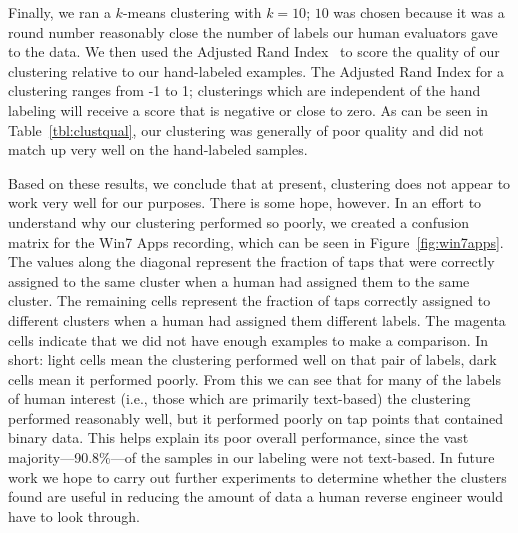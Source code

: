 Finally, we ran a $k$-means clustering with $k = 10$; $10$ was chosen
because it was a round number reasonably close the number of labels our
human evaluators gave to the data. We then used the Adjusted Rand
Index~\cite{Hubert:1985zr} to score the quality of our clustering
relative to our hand-labeled examples. The Adjusted Rand Index for a
clustering ranges from -1 to 1; clusterings which are independent of the
hand labeling will receive a score that is negative or close to zero. As
can be seen in Table~\ref{tbl:clustqual}, our clustering was generally
of poor quality and did not match up very well on the hand-labeled
samples.

Based on these results, we conclude that at present, clustering does not
appear to work very well for our purposes. There is some hope, however.
In an effort to understand why our clustering performed so poorly, we
created a confusion matrix for the Win7 Apps recording, which can be
seen in Figure~\ref{fig:win7apps}. The values along the diagonal
represent the fraction of taps that were correctly assigned to the
same cluster when a human had assigned them to the same cluster. The
remaining cells represent the fraction of taps correctly assigned to
different clusters when a human had assigned them different labels. The
magenta cells indicate that we did not have enough examples to make a
comparison. In short: light cells mean the clustering performed well on
that pair of labels, dark cells mean it performed poorly. From this we
can see that for many of the labels of human interest (i.e., those which
are primarily text-based) the clustering performed reasonably well,
but it performed poorly on tap points that contained binary data. This
helps explain its poor overall performance, since the vast
majority---90.8\%---of the samples in our labeling were not text-based.
In future work we hope to carry out further experiments to determine
whether the clusters found are useful in reducing the amount of data a
human reverse engineer would have to look through.

